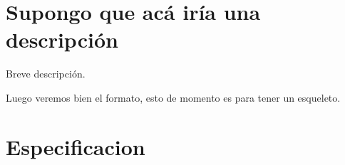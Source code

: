 \documentclass[11pt,a4paper]{article}
\begin{document}
\maketitle

\section{Supongo que acá iría una descripción}

Breve descripción.

Luego veremos bien el formato, esto de momento es para tener un esqueleto.

\section{Especificacion}

\end{document}
